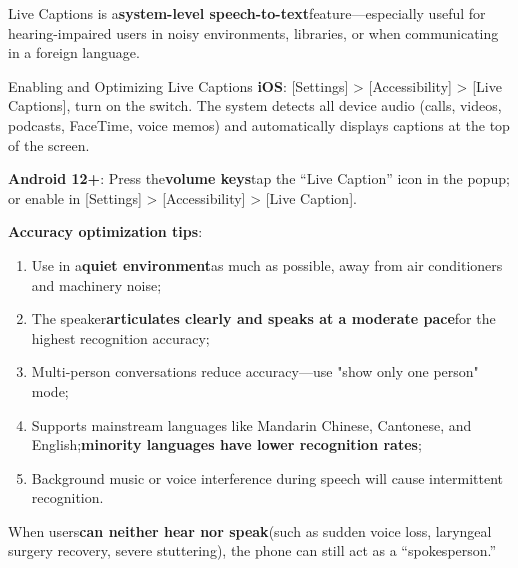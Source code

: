 
Live Captions is a\textbf{system-level speech-to-text}feature—especially useful for hearing-impaired users in noisy environments, libraries, or when communicating in a foreign language.

\begin{tcbinfo}{Enabling and Optimizing Live Captions}
\textbf{iOS}: [Settings] > [Accessibility] > [Live Captions], turn on the switch. The system detects all device audio (calls, videos, podcasts, FaceTime, voice memos) and automatically displays captions at the top of the screen.

\textbf{Android 12+}: Press the\textbf{volume keys}tap the “Live Caption” icon in the popup; or enable in [Settings] > [Accessibility] > [Live Caption].

\textbf{Accuracy optimization tips}:

\begin{enumerate}
  \item Use in a\textbf{quiet environment}as much as possible, away from air conditioners and machinery noise;
  \item The speaker\textbf{articulates clearly and speaks at a moderate pace}for the highest recognition accuracy;
  \item Multi-person conversations reduce accuracy—use "show only one person" mode;
  \item Supports mainstream languages like Mandarin Chinese, Cantonese, and English;\textbf{minority languages have lower recognition rates};
  \item Background music or voice interference during speech will cause intermittent recognition.
\end{enumerate}

\end{tcbinfo}


When users\textbf{can neither hear nor speak}(such as sudden voice loss, laryngeal surgery recovery, severe stuttering), the phone can still act as a “spokesperson.”

